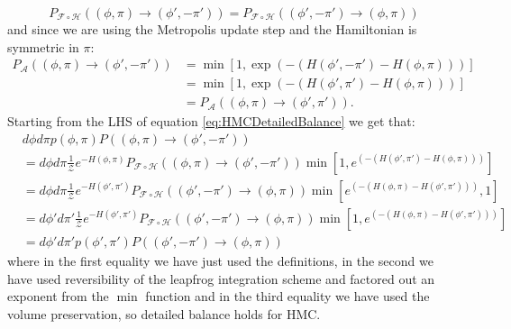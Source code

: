 \documentclass[12pt]{article}
\begin{document}
            \begin{equation}
                P_{\mathcal{F}\circ \mathcal{H}}\left(\left(\phi,\pi\right) \rightarrow \left(\phi',-\pi'\right)\right) =  P_{\mathcal{F}\circ \mathcal{H}}\left(\left(\phi',-\pi'\right) \rightarrow \left(\phi,\pi\right)\right)
            \end{equation}
            and since we are using the Metropolis update step and the Hamiltonian is symmetric in $\pi$:
            \begin{align}
                P_{\mathcal{A}}\left(\left(\phi,\pi\right)\rightarrow \left(\phi',-\pi'\right)\right) & = \min\left[1,\exp\left(-\left(H\left(\phi',-\pi'\right)-H\left(\phi,\pi\right)\right)\right)\right] \\
                & = \min\left[1,\exp\left(-\left(H\left(\phi',\pi'\right)-H\left(\phi,\pi\right)\right)\right)\right] \\
                & = P_{\mathcal{A}}\left(\left(\phi,\pi\right)\rightarrow \left(\phi',\pi'\right)\right).
            \end{align}
            Starting from the LHS of equation \ref{eq:HMCDetailedBalance} we get that:
            \begin{align}
                & d\phi d\pi p\left(\phi,\pi\right) P\left(\left(\phi,\pi\right)\rightarrow\left(\phi',-\pi'\right)\right) \\
                 & = d\phi d\pi \frac{1}{\mathcal{Z}}e^{-H\left(\phi,\pi\right)}P_{\mathcal{F}\circ \mathcal{H}}\left(\left(\phi,\pi\right) \rightarrow \left(\phi',-\pi'\right)\right)\min{\left[1,e^{\left(-\left(H\left(\phi',\pi'\right)-H\left(\phi,\pi\right)\right)\right)}\right]}\\ 
                 & = d\phi d\pi \frac{1}{\mathcal{Z}}e^{-H\left(\phi',\pi'\right)}P_{\mathcal{F} \circ \mathcal{H}}\left(\left(\phi',-\pi'\right) \rightarrow \left(\phi,\pi\right)\right)\min{\left[e^{\left(-\left(H\left(\phi,\pi\right)-H\left(\phi',\pi'\right)\right)\right)},1\right]}\\
                 & = d\phi' d\pi' \frac{1}{\mathcal{Z}}e^{-H\left(\phi',\pi'\right)}P_{\mathcal{F} \circ \mathcal{H}}\left(\left(\phi',-\pi'\right) \rightarrow \left(\phi,\pi\right)\right)\min\left[1,e^{\left(-\left(H\left(\phi,\pi\right)-H\left(\phi',\pi'\right)\right)\right)}\right]\\
                 & = d\phi' d\pi' p\left(\phi',\pi'\right) P\left(\left(\phi',-\pi'\right)\rightarrow\left(\phi,\pi\right)\right)
            \end{align}
            where in the first equality we have just used the definitions, in the second we have used reversibility of the leapfrog integration scheme and factored out an exponent from the $\min$ function and in the third equality we have used the volume preservation, so detailed balance holds for HMC.
\end{document}

